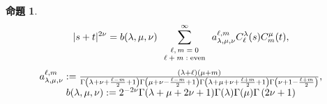 \documentclass[pdf,notes]{beamer}
\newcommand{\tmop}[1]{\ensuremath{\operatorname{#1}}}
\newtheorem{prop}{命題}
\newtheorem{remark}{注}
\begin{document}
\begin{frame}
	\begin{prop}\label{prop:exp-st-gg}
		\begin{equation}
			| s + t |^{2 \nu} =b(\lambda,\mu,\nu) \sum_{\mbox{\scriptsize $\begin{array}[]{c}
			\ell, m = 0 \\ \ell + m : \tmop{even}
		\end{array}$}}^{\infty} a_{\lambda,\mu,\nu}^{\ell,m} C_\ell^{\lambda} (s) C_m^{\mu} (t),
			\label{eqn:exp-st-gg}
		\end{equation}
		{
		\begin{equation*}
			\begin{array}[]{c}
	a_{\lambda,\mu,\nu}^{\ell,m}:= \frac{ (\lambda + \ell) (\mu + m)   }{\Gamma \left( \lambda + \nu + \frac{\ell -
  m}{2} + 1 \right)  \Gamma \left( \mu + \nu -
  \frac{\ell - m}{2} + 1 \right) \Gamma \left( \lambda + \mu + \nu + \frac{\ell +
  m}{2} + 1 \right)\Gamma\left(  \nu+1-\frac{\ell+m}{2}\right)},\\
  b(\lambda,\mu,\nu):=2^{-2\nu}\Gamma (\lambda + \mu + 2 \nu + 1){\Gamma (\lambda)
  \Gamma (\mu)\Gamma \left( 2\nu +
1 \right)}
			\end{array}
		\end{equation*}
	}
	\end{prop}
\end{frame}
\end{document}

